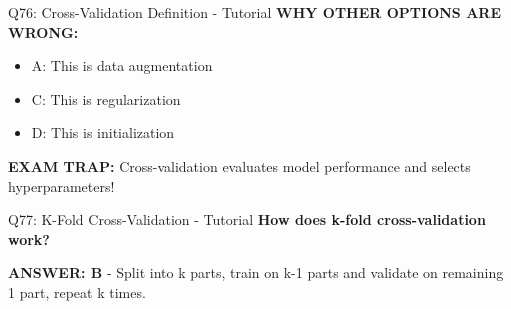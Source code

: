 \documentclass[8pt]{beamer}
\begin{document}
\begin{frame}{Q76: Cross-Validation Definition - Tutorial}
		\vspace{0.05cm}
		\textcolor{myred}{\textbf{WHY OTHER OPTIONS ARE WRONG:}}
		\begin{itemize}
			\item \textcolor{myred}{A:} This is data augmentation
			\item \textcolor{myred}{C:} This is regularization
			\item \textcolor{myred}{D:} This is initialization
		\end{itemize}
		
		\textcolor{myred}{\textbf{EXAM TRAP:}} Cross-validation evaluates model performance and selects hyperparameters!
	\end{frame}
	
	\begin{frame}{Q77: K-Fold Cross-Validation - Tutorial}
		\fontsize{6.5}{7.5}\selectfont
		\textbf{How does k-fold cross-validation work?}
		
		\vspace{0.05cm}
		\textcolor{myblue}{\textbf{ANSWER: B}} - Split into k parts, train on k-1 parts and validate on remaining 1 part, repeat k times.
		

\end{frame}
\end{document}
